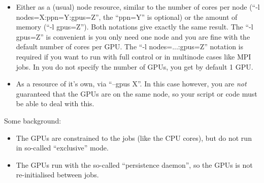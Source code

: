 \begin{itemize}
\item Either as a (usual) node resource, similar to the number of cores
  per node (``-l nodes=X:ppn=Y:gpus=Z'', the ``ppn=Y'' is optional)
  or the amount of memory (``-l gpus=Z'').
  Both notations give exactly the same result.
  The ``-l gpus=Z'' is convenient is you only need one
  node and you are fine with the default number of cores per GPU.
  The ``-l nodes=...:gpus=Z'' notation is required if you want to run with full control or in multinode cases like MPI jobs.
  In you do not specify the number of GPUs, you get by default 1 GPU.
\item As a resource of it's own, via ``--gpus X''.
  In this case however, you are \emph{not} guaranteed that the GPUs are on the same node,
  so your script or code must be able to deal with this.
\end{itemize}

Some background:
\begin{itemize}
\item The GPUs are constrained to the jobs (like the CPU cores), but do not run in so-called ``exclusive'' mode.
\item The GPUs run with the so-called ``persistence daemon'', so the GPUs is not re-initialised between jobs.
\end{itemize}


